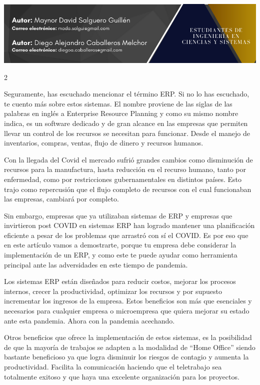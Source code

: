 \documentclass[12pt,spanish,Letterpaper,openany]{book}
\begin{document}
\begin{center}\includegraphics[width=1\linewidth]{images/pareja38_01} \end{center}

\begin {multicols}{2}

Seguramente, has escuchado mencionar el término ERP. Si no lo has escuchado, te cuento
más sobre estos sistemas. El nombre proviene de las siglas de las palabras en inglés a
Enterprise Resource Planning y como su mismo nombre indica, es un software dedicado y de
gran alcance en las empresas que permiten llevar un control de los recursos se necesitan para
funcionar. Desde el manejo de inventarios, compras, ventas, flujo de dinero y recursos
humanos.

Con la llegada del Covid el mercado sufrió grandes cambios como disminución de recursos
para la manufactura, hasta reducción en el recurso humano, tanto por enfermedad, como por
restricciones gubernamentales en distintos países. Esto trajo como repercusión que el flujo
completo de recursos con el cual funcionaban las empresas, cambiará por completo.

Sin embargo, empresas que ya utilizaban sistemas de ERP y empresas que invirtieron post
COVID en sistemas ERP han logrado mantener una planificación eficiente a pesar de los
problemas que arrastró con sí el COVID. Es por eso que en este artículo vamos a demostrarte,
porque tu empresa debe considerar la implementación de un ERP, y como este te puede
ayudar como herramienta principal ante las adversidades en este tiempo de pandemia.

Los sistemas ERP están diseñados para reducir costos, mejorar los procesos internos, crecer
la productividad, optimizar los recursos y por supuesto incrementar los ingresos de la
empresa. Estos beneficios son más que esenciales y necesarios para cualquier empresa o
microempresa que quiera mejorar su estado ante esta pandemia. Ahora con la pandemia
acechando.

Otros beneficios que ofrece la implementación de estos sistemas, es la posibilidad de que la
mayoría de trabajos se adapten a la modalidad de ``Home Office'' siendo bastante beneficioso
ya que logra disminuir los riesgos de contagio y aumenta la productividad. Facilita la
comunicación haciendo que el teletrabajo sea totalmente exitoso y que haya una excelente
organización para los proyectos.


\end{multicols}
\end{document}
